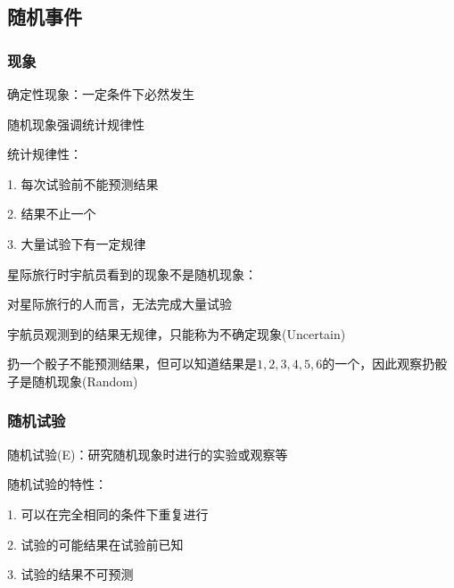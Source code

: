 \subsection{随机事件}%
\label{sub:随机事件}
\subsubsection{现象}%
\label{subsub:现象}
确定性现象：一定条件下必然发生

随机现象强调统计规律性

\begin{notation}
统计规律性：

1. 每次试验前不能预测结果

2. 结果不止一个

3. 大量试验下有一定规律
\end{notation}
\begin{eg}
    星际旅行时宇航员看到的现象不是随机现象：

    对星际旅行的人而言，无法完成大量试验

    宇航员观测到的结果无规律，只能称为不确定现象(Uncertain)
\end{eg}
\begin{eg}
    扔一个骰子不能预测结果，但可以知道结果是$1,2,3,4,5,6$的一个，因此观察扔骰子是随机现象(Random)
\end{eg}
\subsubsection{随机试验}%
\label{subsub:随机试验}
随机试验(E)：研究随机现象时进行的实验或观察等

\begin{notation}
    随机试验的特性：

    1. 可以在完全相同的条件下重复进行

    2. 试验的可能结果在试验前已知

    3. 试验的结果不可预测
\end{notation}
